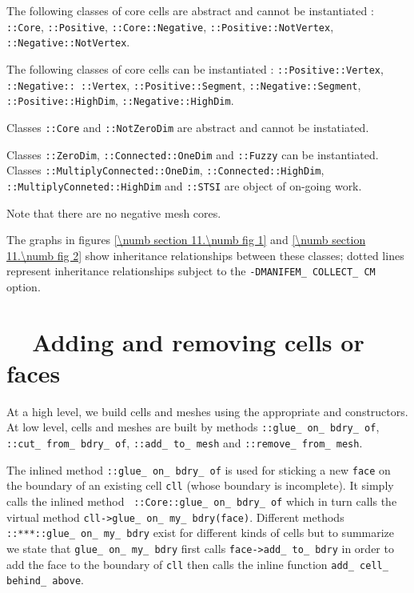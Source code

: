 The following classes of core cells are abstract and cannot be instantiated :
{\small\tt {}::Core}, {\small\tt {}::Positive},
{\small\tt {}::Core::Negative}, {\small\tt {}::Positive::NotVertex},
{\small\tt {}::Negative::NotVertex}.

The following classes of core cells can be instantiated :
{\small\tt {}::Positive::Vertex}, {\small\tt {}::Negative:: ::Vertex},
{\small\tt {}::Positive::Segment}, {\small\tt {}::Negative::Segment},
{\small\tt {}::Positive::HighDim},\break
{\small\tt {}::Negative::HighDim}.

Classes {\small\tt {}::Core} and {\small\tt {}::NotZeroDim} are abstract
and cannot be instatiated.

Classes {\small\tt {}::ZeroDim}, {\small\tt {}::Connected::OneDim} and
{\small\tt {}::Fuzzy} can be instantiated.
Classes {\small\tt {}::MultiplyConnected::OneDim},
{\small\tt {}::Connected::HighDim}, {\small\tt {}::MultiplyConneted::HighDim}
and {\small\tt {}::STSI} are object of on-going work.

Note that there are no negative mesh cores.

The graphs in figures \ref{\numb section 11.\numb fig 1} and \ref{\numb section 11.\numb fig 2}
show inheritance relationships between these classes; dotted lines represent
inheritance relationships  subject to the {\small\tt -DMANIFEM\_\,COLLECT\_\,CM} option.


\section{~~Adding and removing cells or faces}\label{\numb section 11.\numb parag 9}

At a high level, we build cells and meshes using the appropriate {\small\tt {}} and
{\small\tt {}} constructors.
At low level, cells and meshes are built by methods {\small\tt {}::glue\_\,on\_\,bdry\_\,of},
{\small\tt {}::cut\_\,from\_\,bdry\_\,of}, {\small\tt {}::add\_\,to\_\,mesh} and
{\small\tt {}::remove\_\,from\_\,mesh}.

The inlined method {\small\tt {}::glue\_\,on\_\,bdry\_\,of} is used for sticking a new
{\small\tt face} on the
boundary of an existing cell {\small\tt cll} (whose boundary is incomplete).
It simply calls the inlined method \ {\small\tt {}::Core::glue\_\,on\_\,bdry\_\,of}
which in turn calls the virtual method {\small\tt cll->glue\_\,on\_\,my\_\,bdry(face)}.
Different methods {\small\tt {}::***::glue\_\,on\_\,my\_\,bdry} exist for different kinds of
cells but to summarize we state that {\small\tt glue\_\,on\_\,my\_\,bdry} first calls
{\small\tt face->add\_\,to\_\,bdry} in order to add the face to the boundary of {\small\tt cll}
then calls the inline function {\small\tt add\_\,cell\_\,behind\_\,above}.


